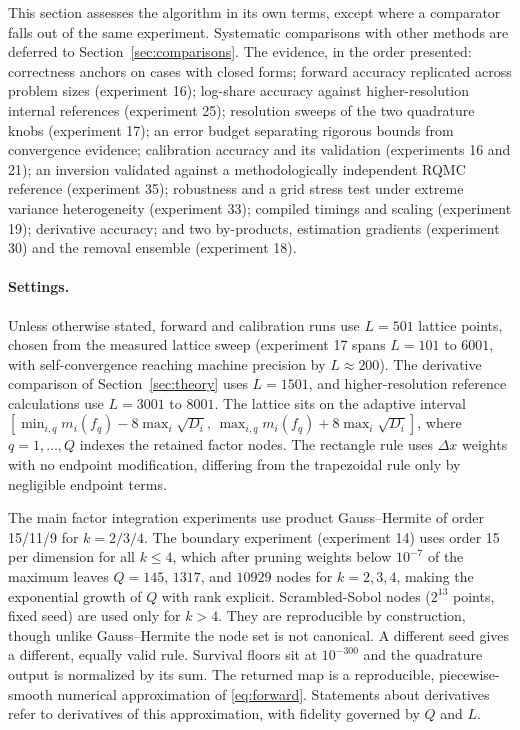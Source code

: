 \documentclass[12pt]{article}
\theoremstyle{remark}
\begin{document}
This section assesses the algorithm in its own terms, except where a
comparator falls out of the same experiment. Systematic comparisons
with other methods are deferred to Section~\ref{sec:comparisons}. The
evidence, in the order presented: correctness anchors on cases with
closed forms; forward accuracy replicated across problem sizes
(experiment 16); log-share accuracy against higher-resolution internal
references (experiment 25); resolution sweeps of the two quadrature
knobs (experiment 17); an error budget separating rigorous bounds from
convergence evidence; calibration accuracy and its validation
(experiments 16 and 21); an inversion validated against a
methodologically independent RQMC reference (experiment 35); robustness
and a grid stress test under extreme variance heterogeneity (experiment
33); compiled timings and scaling (experiment 19); derivative accuracy;
and two by-products, estimation gradients (experiment 30) and the
removal ensemble (experiment 18).

\paragraph{Settings.} Unless otherwise stated, forward and
calibration runs use $L = 501$ lattice points, chosen from the measured
lattice sweep (experiment 17 spans $L = 101$ to $6001$, with
self-convergence reaching machine precision by $L \approx 200$). The
derivative comparison of Section~\ref{sec:theory} uses $L = 1501$,
and higher-resolution reference calculations use $L = 3001$ to $8001$. The lattice sits on
the adaptive interval
$[\min_{i,q} m_i(f_q) - 8\max_i\sqrt{D_i},\,
\max_{i,q} m_i(f_q) + 8\max_i\sqrt{D_i}]$, where $q = 1, \dots, Q$ indexes
the retained factor nodes. The rectangle rule uses $\Delta x$ weights
with no endpoint modification, differing from the trapezoidal rule only
by negligible endpoint terms.

The main factor integration experiments use product
Gauss--Hermite of order 15/11/9 for $k = 2/3/4$. The boundary experiment
(experiment 14) uses order 15 per dimension for all $k \le 4$, which after
pruning weights below $10^{-7}$ of the maximum leaves $Q = 145$, $1317$, and
$10929$ nodes for $k = 2, 3, 4$, making the exponential growth of $Q$
with rank explicit. Scrambled-Sobol nodes ($2^{13}$ points, fixed seed)
are used only for $k > 4$. They are reproducible by construction, though
unlike Gauss--Hermite the node set is not canonical. A different seed
gives a different, equally valid rule. Survival floors sit at
$10^{-300}$ and the quadrature output is normalized by its sum. The
returned map is a reproducible, piecewise-smooth numerical approximation
of \eqref{eq:forward}. Statements about derivatives refer to
derivatives of this approximation, with fidelity governed by $Q$ and
$L$.
\end{document}
